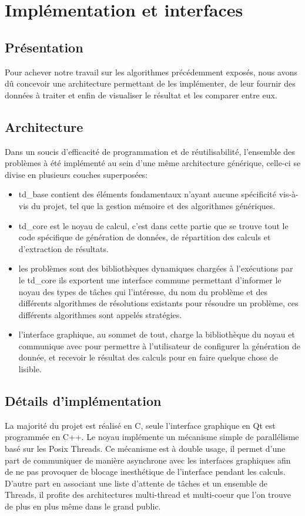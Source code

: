 \chapter{Implémentation et interfaces}
\section{Présentation}
Pour achever notre travail sur les algorithmes précédemment exposés, nous avons
dû concevoir une architecture permettant de les implémenter, de leur fournir des
données à traiter et enfin de visualiser le résultat et les comparer entre eux.
\section{Architecture}
Dans un soucis d'efficacité de programmation et de réutilisabilité, l'ensemble
des problèmes à été implémenté au sein d'une même architecture générique, celle-ci
se divise en plusieurs couches superposées:
\begin{itemize}
   \item td\_base contient des éléments fondamentaux n'ayant aucune spécificité
   vis-à-vis du projet, tel que la gestion mémoire et des algorithmes génériques.
   \item td\_core est le noyau de calcul, c'est dans cette partie que se trouve
   tout le code spécifique de génération de données, de répartition des calculs
   et d'extraction de résultats.
   \item les problèmes sont des bibliothèques dynamiques chargées à l'exécutions
   par le td\_core ils exportent une interface commune permettant d'informer le
   noyau des types de tâches qui l'intéresse, du nom du problème et des
   différents algorithmes de résolutions existants pour résoudre un problème,
   ces différents algorithmes sont appelés stratégies.
   \item l'interface graphique, au sommet de tout, charge la bibliothèque du 
   noyau et communique avec pour permettre à l'utilisateur de configurer la
   génération de donnée, et recevoir le résultat des calculs pour en faire
   quelque chose de lisible.
\end{itemize}
\section{Détails d'implémentation}
La majorité du projet est réalisé en C, seule l'interface graphique en Qt est programmée en C++. Le noyau implémente un mécanisme simple de parallélisme basé sur les Posix Threads.
Ce mécanisme est à double usage, il permet d'une part de communiquer de manière
asynchrone avec les interfaces graphiques afin de ne pas provoquer de blocage
inesthétique de l'interface pendant les calculs. D'autre part en associant une
liste d'attente de tâches et un ensemble de Threads, il profite des architectures
multi-thread et multi-coeur que l'on trouve de plus en plus même dans le grand
public.

